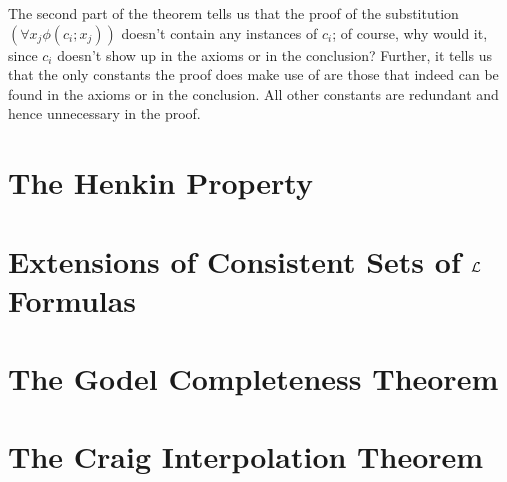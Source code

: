 \documentclass{article}
\begin{document}
The second part of the theorem tells us that the proof of the substitution $ (\forall x_j \phi(c_i; x_j)) $ doesn't contain any instances of $ c_i $; of course, why would it, since $ c_i $ doesn't show up in the axioms or in the conclusion? Further, it tells us that the only constants the proof does make use of are those that indeed can be found in the axioms or in the conclusion. All other constants are redundant and hence unnecessary in the proof.

\section{The Henkin Property}

\section{Extensions of Consistent Sets of $ \mathcal{L} $ Formulas}

\section{The Godel Completeness Theorem}

\section{The Craig Interpolation Theorem}
\end{document}
